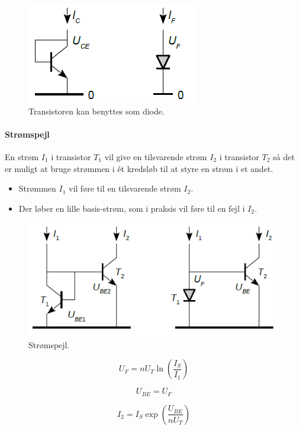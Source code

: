 \documentclass[danish]{article}
\begin{document}
\begin{figure} [H]
	\centering
	\includegraphics[width=0.5\linewidth]{graphics/diodekobling}
	\caption{Transistoren kan benyttes som diode.}
	\label{fig:diodekobling}
\end{figure}

\paragraph{Strømspejl}
En strøm $I_1$ i transistor $T_1$ vil give en tilsvarende strøm $I_2$ i transistor $T_2$ så det er muligt at bruge strømmen i ét kredsløb til at styre en strøm i et andet.
\begin{itemize}
	\item Strømmen $I_1$ vil føre til en tilsvarende strøm $I_2$.
	\item Der løber en lille basis-strøm, som i praksis vil føre til en fejl i $I_2$.
\end{itemize}

\begin{figure} [H]
	\centering
	\includegraphics[width=0.8\linewidth]{graphics/diodekobling1}
	\caption{Strømspejl.}
	\label{fig:currentmirror}
\end{figure}

\begin{equation} 
U_F = n U_T \ln{\left(\frac{I_S}{I_1}\right)}
\end{equation}

\begin{equation} 
U_{BE} = U_F
\end{equation}

\begin{equation} 
I_2 = I_S \exp{\left(\frac{U_{BE}}{n U_T}\right)}
\end{equation}
\end{document}
